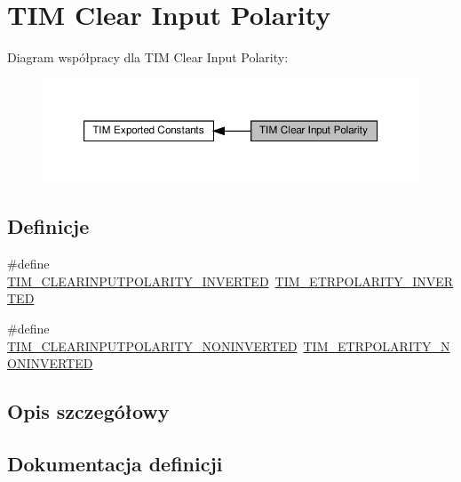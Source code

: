 \hypertarget{group___t_i_m___clear_input___polarity}{}\section{T\+IM Clear Input Polarity}
\label{group___t_i_m___clear_input___polarity}
Diagram współpracy dla T\+IM Clear Input Polarity\+:\nopagebreak
\begin{figure}[H]
\begin{center}
\leavevmode
\includegraphics[width=350pt]{group___t_i_m___clear_input___polarity}
\end{center}
\end{figure}
\subsection*{Definicje}
\begin{DoxyCompactItemize}
\item 
\#define \hyperlink{group___t_i_m___clear_input___polarity_ga02e0d10a2cf90016d1a8be1931c6c67e}{T\+I\+M\+\_\+\+C\+L\+E\+A\+R\+I\+N\+P\+U\+T\+P\+O\+L\+A\+R\+I\+T\+Y\+\_\+\+I\+N\+V\+E\+R\+T\+ED}~\hyperlink{group___t_i_m___e_t_r___polarity_ga42652ff688f0042659f8304ae08abfa6}{T\+I\+M\+\_\+\+E\+T\+R\+P\+O\+L\+A\+R\+I\+T\+Y\+\_\+\+I\+N\+V\+E\+R\+T\+ED}
\item 
\#define \hyperlink{group___t_i_m___clear_input___polarity_ga53e02f7692e6996389b462219572f2a9}{T\+I\+M\+\_\+\+C\+L\+E\+A\+R\+I\+N\+P\+U\+T\+P\+O\+L\+A\+R\+I\+T\+Y\+\_\+\+N\+O\+N\+I\+N\+V\+E\+R\+T\+ED}~\hyperlink{group___t_i_m___e_t_r___polarity_ga7fa7c43245b25564414b2e191d5d8b14}{T\+I\+M\+\_\+\+E\+T\+R\+P\+O\+L\+A\+R\+I\+T\+Y\+\_\+\+N\+O\+N\+I\+N\+V\+E\+R\+T\+ED}
\end{DoxyCompactItemize}


\subsection{Opis szczegółowy}


\subsection{Dokumentacja definicji}
\mbox{\label{group___t_i_m___clear_input___polarity_ga02e0d10a2cf90016d1a8be1931c6c67e}} 
